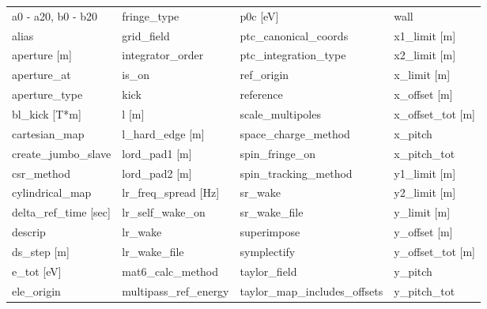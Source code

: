  \begin{tabular}{llll} \toprule
a0 - a20, b0 - b20             & fringe_type                    & p0c [eV]                       & wall                           \\
alias                          & grid_field                     & ptc_canonical_coords           & x1_limit [m]                   \\
aperture [m]                   & integrator_order               & ptc_integration_type           & x2_limit [m]                   \\
aperture_at                    & is_on                          & ref_origin                     & x_limit [m]                    \\
aperture_type                  & kick                           & reference                      & x_offset [m]                   \\
bl_kick [T*m]                  & l [m]                          & scale_multipoles               & x_offset_tot [m]               \\
cartesian_map                  & l_hard_edge [m]                & space_charge_method            & x_pitch                        \\
create_jumbo_slave             & lord_pad1 [m]                  & spin_fringe_on                 & x_pitch_tot                    \\
csr_method                     & lord_pad2 [m]                  & spin_tracking_method           & y1_limit [m]                   \\
cylindrical_map                & lr_freq_spread [Hz]            & sr_wake                        & y2_limit [m]                   \\
delta_ref_time [sec]           & lr_self_wake_on                & sr_wake_file                   & y_limit [m]                    \\
descrip                        & lr_wake                        & superimpose                    & y_offset [m]                   \\
ds_step [m]                    & lr_wake_file                   & symplectify                    & y_offset_tot [m]               \\
e_tot [eV]                     & mat6_calc_method               & taylor_field                   & y_pitch                        \\
ele_origin                     & multipass_ref_energy           & taylor_map_includes_offsets    & y_pitch_tot                    \\

\end{tabular}

